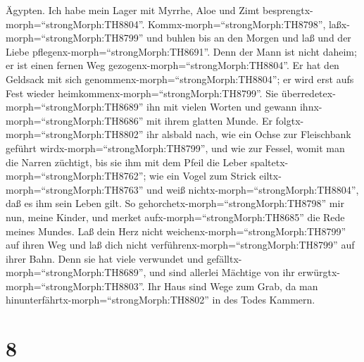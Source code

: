 Ägypten.  Ich habe mein Lager mit Myrrhe, Aloe und Zimt
besprengtx-morph=``strongMorph:TH8804''. 
Kommx-morph=``strongMorph:TH8798'', laßx-morph=``strongMorph:TH8799''
und buhlen bis an den Morgen und laß und der Liebe
pflegenx-morph=``strongMorph:TH8691''.  Denn der Mann ist
nicht daheim; er ist einen fernen Weg
gezogenx-morph=``strongMorph:TH8804''.  Er hat den Geldsack
mit sich genommenx-morph=``strongMorph:TH8804''; er wird erst aufs Fest
wieder heimkommenx-morph=``strongMorph:TH8799''.  Sie
überredetex-morph=``strongMorph:TH8689'' ihn mit vielen Worten und
gewann ihnx-morph=``strongMorph:TH8686'' mit ihrem glatten Munde.
 Er folgtx-morph=``strongMorph:TH8802'' ihr alsbald nach,
wie ein Ochse zur Fleischbank geführt
wirdx-morph=``strongMorph:TH8799'', und wie zur Fessel, womit man die
Narren züchtigt,  bis sie ihm mit dem Pfeil die Leber
spaltetx-morph=``strongMorph:TH8762''; wie ein Vogel zum Strick
eiltx-morph=``strongMorph:TH8763'' und weiß
nichtx-morph=``strongMorph:TH8804'', daß es ihm sein Leben gilt.
 So gehorchetx-morph=``strongMorph:TH8798'' mir nun, meine
Kinder, und merket aufx-morph=``strongMorph:TH8685'' die Rede meines
Mundes.  Laß dein Herz nicht
weichenx-morph=``strongMorph:TH8799'' auf ihren Weg und laß dich nicht
verführenx-morph=``strongMorph:TH8799'' auf ihrer Bahn. 
Denn sie hat viele verwundet und gefälltx-morph=``strongMorph:TH8689'',
und sind allerlei Mächtige von ihr
erwürgtx-morph=``strongMorph:TH8803''.  Ihr Haus sind Wege
zum Grab, da man hinunterfährtx-morph=``strongMorph:TH8802'' in des
Todes Kammern.

\hypertarget{section-7}{%
\section{8}\label{section-7}}

